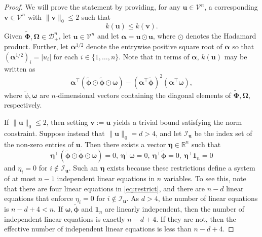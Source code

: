 \documentclass[12pt]{article}
\newcommand{\bl}[1]{{\mathbf #1}}
\newcommand{\bs}[1]{\boldsymbol #1}
\begin{document}
\begin{proof}
We will prove the statement by providing, for any $\bl{u} \in \mathcal{V}^n$, a corresponding $\bl{v} \in \mathcal{V}^n$ with $\|\bl{v}\|_{0} \leq 2$ such that
\begin{equation*}
    k(\bl{u}) \leq k(\bl{v}).
\end{equation*}
Given $\tilde{\bs{\Phi}}, \bs{\Omega} \in \mathcal{D}_+^n$, let $\bl{u} \in \mathcal{V}^n$ and let $\bs{\alpha} = \bl{u} \odot \bl{u}$, where $\odot$ denotes the Hadamard product. Further, let $\bs{\alpha}^{1/2}$ denote the entrywise positive square root of $\bs{\alpha}$ so that $(\bs{\alpha}^{1/2})_i = |u_i|$ for each $i \in \{1, \dots, n\}$. Note that in terms of $\bs{\alpha}$, $k(\bl{u})$ may be written as
\begin{equation}\label{eq:simplex}
    \bs{\alpha}^\top (\tilde{\bs{\phi}} \odot \tilde{\bs{\phi}} \odot \bs{\omega}) - (\bs{\alpha}^\top \tilde{\bs{\phi}})^2 (\bs{\alpha}^\top \bs{\omega}),
\end{equation}
where $\tilde{\phi}, \bs{\omega}$ are $n$-dimensional vectors containing the diagonal elements of $\tilde{\bs{\Phi}}, \bs{\Omega}$, respectively.
    
If $\|\bl{u}\|_0 \leq 2$, then setting $\bl{v} := \bl{u}$ yields a trivial bound satisfying the norm constraint. Suppose instead that $\|\bl{u}\|_0 = d > 4$, and let $\mathcal{I}_{\bl{u}}$ be the index set of the non-zero entries of $\bl{u}$. Then there exists a vector $\bs{\eta} \in \mathbb{R}^{n}$ such that
\begin{equation}\label{eq:restrict}
    \bs{\eta}^\top (\tilde{\bs{\phi}} \odot \tilde{\bs{\phi}} \odot \bs{\omega}) = 0,~\bs{\eta}^\top \bs{\omega}= 0,~ \bs{\eta}^\top \tilde{\bs{\phi}}=0, ~ \bs{\eta}^\top \bl{1}_n =0
\end{equation}
and $\eta_i = 0$ for $i \notin \mathcal{I}_{\bl{u}}$. Such an $\bs{\eta}$ exists because these restrictions define a system of at most $n-1$ independent linear equations in $n$ variables. To see this, note that there are four linear equations in \eqref{eq:restrict}, and there are $n-d$ linear equations that enforce $\eta_i = 0$ for $i \notin \mathcal{I}_{\bl{u}}$. As $d > 4$, the number of linear equations is $n - d + 4 < n$. If $\bs{\omega}, \tilde{\bs{\phi}}$ and $\bl{1}_n$ are linearly independent, then the number of independent linear equations is exactly $n-d+4$. If they are not, then the effective number of independent linear equations is less than $n-d+4$. 
    

\end{proof}
\end{document}
